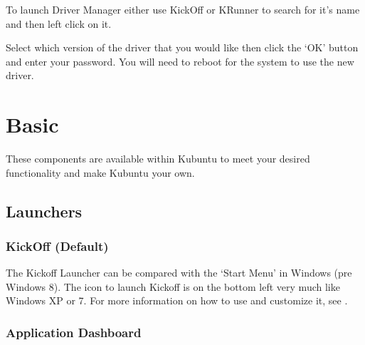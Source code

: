 \documentclass[letterpaper,10pt,english]{sphinxmanual}
\begin{document}
To launch Driver Manager either use KickOff or KRunner to search for it’s name and then left click on it.


Select which version of the driver that you would like then click the ‘OK’ button and enter your password. You will need to reboot for the system to use the new driver.


\chapter{Basic}
\label{\detokenize{docs/basic:basic}}\label{\detokenize{docs/basic:basic-link}}\label{\detokenize{docs/basic::doc}}
These components are available within Kubuntu to meet your desired functionality and make Kubuntu your own.


\section{Launchers}
\label{\detokenize{docs/basic:launchers}}

\subsection{KickOff (Default)}
\label{\detokenize{docs/basic:kickoff-default}}

The Kickoff Launcher can be compared with the ‘Start Menu’ in Windows (pre Windows 8). The icon to launch Kickoff is on the bottom left very much like Windows XP or 7. For more information on how to use and customize it, see .


\subsection{Application Dashboard}
\label{\detokenize{docs/basic:application-dashboard}}
\end{document}
